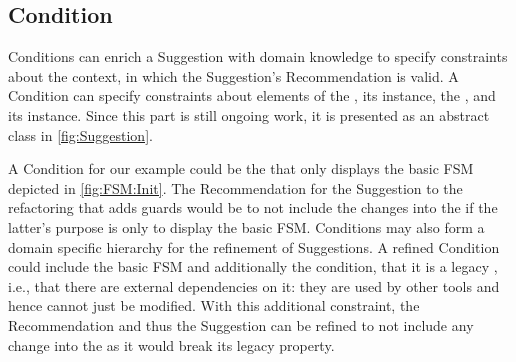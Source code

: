 \subsection{Condition}
\label{sec:Conditions}
\textsf{Condition}s can enrich a \textsf{Suggestion} with domain knowledge to 
specify constraints about the context, in which the \textsf{Suggestion}'s 
\textsf{Recommendation} is valid. A \textsf{Condition} can specify constraints 
about elements of the \metamodel, its instance, the \viewtype \metamodel, and 
its instance. 
Since this part is still ongoing work, it is presented as an abstract class 
in \cref{fig:Suggestion}.

A \textsf{Condition} for our example could be the \viewtype that 
only displays the basic \textsf{FSM} depicted in \cref{fig:FSM:Init}. 
The \textsf{Recommendation} for the \textsf{Suggestion} to the refactoring that 
adds guards would be to not include the \metamodel changes into the \viewtype if the latter's purpose is only to display the basic \textsf{FSM}.
\textsf{Conditions} may also form a 
domain specific hierarchy for the refinement of \textsf{Suggestion}s. A refined 
\textsf{Condition} could include the basic \textsf{FSM} \viewtype and additionally
the condition, that it is a legacy \viewtype, i.e., that there are external dependencies on it: %
they are used by other tools and hence cannot just be modified. With this additional constraint, the 
\textsf{Recommendation} and thus the \textsf{Suggestion} can be refined to not 
include any \metamodel change into the \viewtype as it would break its legacy 
property.